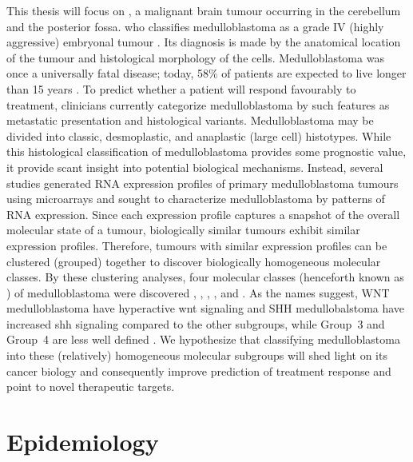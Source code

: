 This thesis will focus on , a malignant brain tumour occurring in the cerebellum and the posterior fossa. \gls{who} classifies medulloblastoma as a grade IV (highly aggressive) embryonal tumour . Its diagnosis is made by the anatomical location of the tumour and histological morphology of the cells. Medulloblastoma was once a universally fatal disease; today, 58\% of patients are expected to live longer than 15 years . To predict whether a patient will respond favourably to treatment, clinicians currently categorize medulloblastoma by such features as metastatic presentation and histological variants. Medulloblastoma may be divided into classic, desmoplastic, and anaplastic (large cell) histotypes. While this histological classification of medulloblastoma provides some prognostic value, it provide scant insight into potential biological mechanisms. Instead, several studies generated RNA expression profiles of primary medulloblastoma tumours using microarrays and sought to characterize medulloblastoma by patterns of RNA expression. Since each expression profile captures a snapshot of the overall molecular state of a tumour, biologically similar tumours exhibit similar expression profiles. Therefore, tumours with similar expression profiles can be clustered (grouped) together to discover biologically homogeneous molecular classes. By these clustering analyses, four molecular classes (henceforth known as ) of medulloblastoma were discovered , , , , and . As the names suggest, WNT medulloblastoma have hyperactive \gls{wnt} signaling and SHH medullobalstoma have increased \gls{shh} signaling compared to the other subgroups, while Group~3 and Group~4 are less well defined . We hypothesize that classifying medulloblastoma into these (relatively) homogeneous molecular subgroups will shed light on its cancer biology and consequently improve prediction of treatment response and point to novel therapeutic targets.


\section{Epidemiology}


